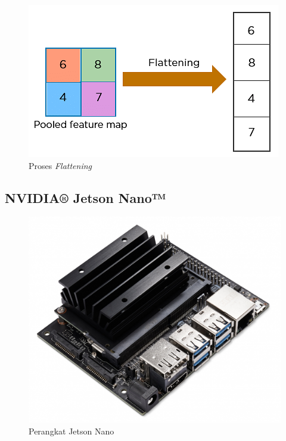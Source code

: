 \begin{figure} [ht] \centering
    \includegraphics[scale=0.6]{gambar/flattening.png}
    \caption{Proses \emph{Flattening}}
    \label{fig:Proses Flattening}
\end{figure}

\newpage

\subsection{NVIDIA® Jetson Nano™}

\begin{figure} [ht] \centering
    \includegraphics[scale=0.25]{gambar/JetsonNano.jpg}
    \caption{Perangkat Jetson Nano}
    \label{fig:Perangkat Jetson Nano}
\end{figure}

